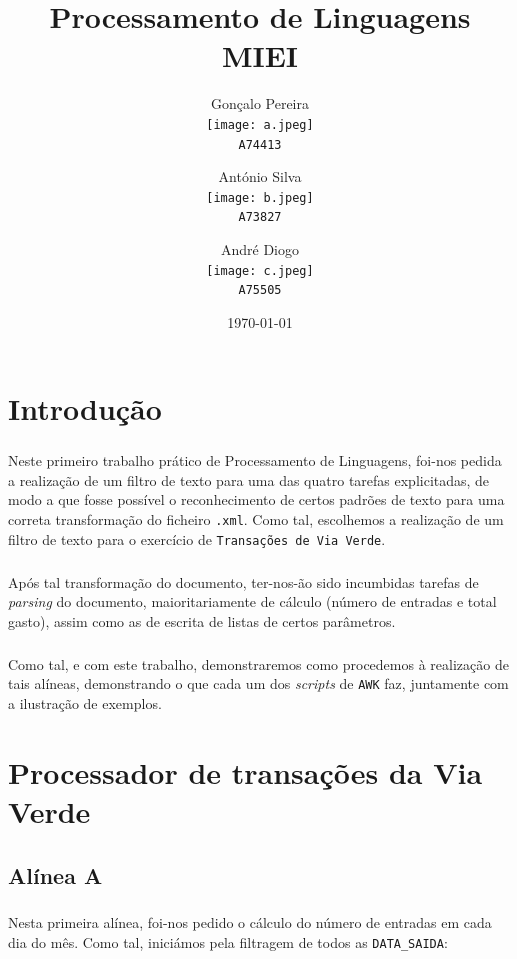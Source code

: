 \documentclass[11pt,a4paper]{report}
\title{Processamento de Linguagens\\MIEI}
\author{
  Gonçalo Pereira\\
  \texttt{[image: a.jpeg]}\\
  \texttt{A74413}
  \and
  António Silva\\
  \texttt{[image: b.jpeg]}\\
  \texttt{A73827}
  \and
  André Diogo\\
  \texttt{[image: c.jpeg]}\\
  \texttt{A75505}
}
\date{\today}
\begin{document}
\maketitle

\tableofcontents
\newpage


\chapter{Introdução}


\paragraph*{}Neste primeiro trabalho prático de Processamento de Linguagens, foi-nos pedida a realização de um filtro de texto para uma das quatro tarefas explicitadas, de modo a que fosse possível o reconhecimento de certos padrões de texto para uma correta transformação do ficheiro \texttt{.xml}. Como tal, escolhemos a realização de um filtro de texto para o exercício de \texttt{Transações de Via Verde}.

\paragraph*{}Após tal transformação do documento, ter-nos-ão sido incumbidas tarefas de \textit{parsing} do documento, maioritariamente de cálculo (número de entradas e total gasto), assim como as de escrita de listas de certos parâmetros. 

\paragraph*{}Como tal, e com este trabalho, demonstraremos como procedemos à realização de tais alíneas, demonstrando o que cada um dos \textit{scripts} de \texttt{AWK} faz, juntamente com a ilustração de exemplos.


\chapter{Processador de transações da Via Verde}


\section{Alínea A}


\paragraph*{}Nesta primeira alínea, foi-nos pedido o cálculo do número de entradas em cada dia do mês. Como tal, iniciámos pela filtragem de todos as \texttt{DATA_SAIDA}:
\end{document}
